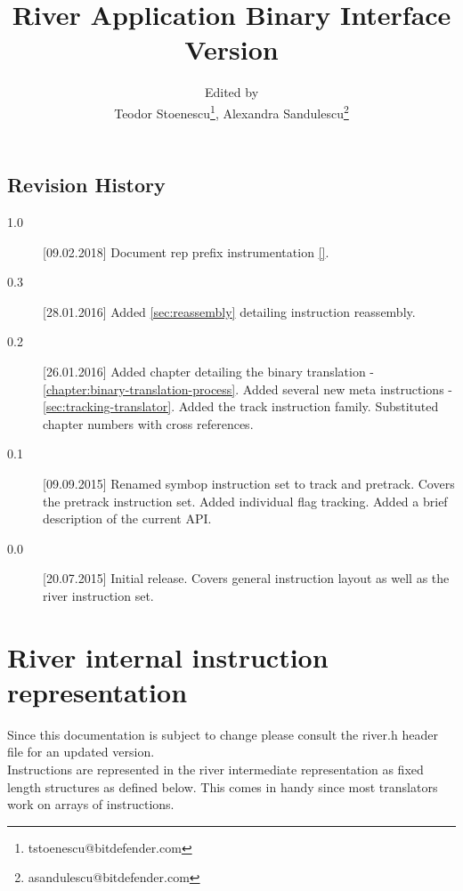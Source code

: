 \documentclass[12pt]{report}
\begin{document}
\author{Edited by\\
  Teodor Stoenescu\thanks{tstoenescu@bitdefender.com},
  Alexandra Sandulescu\thanks{asandulescu@bitdefender.com}}

\title{River Application Binary Interface\\
Version \version}
\maketitle
\tableofcontents

\section*{Revision History}

\begin{description}
	\item[1.0][09.02.2018] Document rep prefix instrumentation \autoref{}.
\item[0.3][28.01.2016] Added \autoref{sec:reassembly} detailing instruction reassembly.
\item[0.2][26.01.2016] Added chapter detailing the binary translation - \autoref{chapter:binary-translation-process}.
Added several new meta instructions - \autoref{sec:tracking-translator}.
Added the track instruction family.
Substituted chapter numbers with cross references.
\item[0.1][09.09.2015] Renamed symbop instruction set to track and pretrack.
Covers the pretrack instruction set.
Added individual flag tracking.
Added a brief description of the current API.
\item[0.0][20.07.2015] Initial release. Covers general instruction layout as well as the river instruction set.
\end{description}

\chapter{River internal instruction representation}
Since this documentation is subject to change please consult the river.h header file for an updated version.\\
Instructions are represented in the river intermediate representation as fixed length structures as defined below. This comes in handy since most translators work on arrays of instructions.


\end{document}
